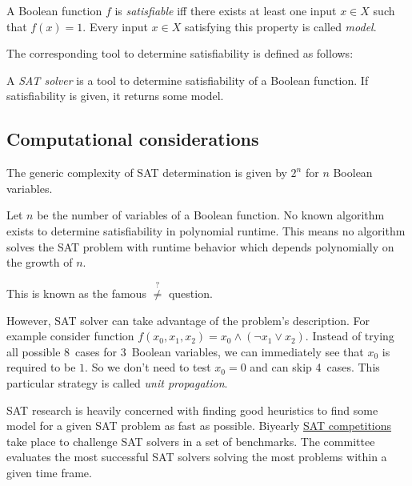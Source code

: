 \begin{defi}
  A Boolean function $f$ is \emph{satisfiable} iff there exists at least one
  input $x \in X$ such that $f(x) = 1$.
  Every input $x \in X$ satisfying this property is called \emph{model}.
\end{defi}

The corresponding tool to determine satisfiability is defined as follows:

\begin{defi}
  A \emph{SAT solver} is a tool to determine satisfiability of a Boolean function.
  If satisfiability is given, it returns some model.
\end{defi}

\subsection{Computational considerations}
\label{label:sat-complexity}
%
The generic complexity of SAT determination is given by $2^n$ for $n$ Boolean variables.

Let $n$ be the number of variables of a Boolean function.
No known algorithm exists to determine satisfiability in polynomial runtime.
This means no algorithm solves the SAT problem with runtime behavior
which depends polynomially on the growth of $n$.

This is known as the famous \cP $\overset{?}{\neq}$ \cNP question.

However, SAT solver can take advantage of the problem's description.
For example consider function $f(x_0, x_1, x_2) = x_0 \land (\neg x_1 \lor x_2)$.
Instead of trying all possible 8~cases for 3~Boolean variables,
we can immediately see that $x_0$ is required to be $1$.
So we don't need to test $x_0 = 0$ and can skip 4~cases.
This particular strategy is called \emph{unit propagation}.

SAT research is heavily concerned with finding good heuristics to find some model
for a given SAT problem as fast as possible. Biyearly
\href{http://satcompetition.org/}{SAT competitions} take place to challenge
SAT solvers in a set of benchmarks. The committee evaluates the most successful
SAT solvers solving the most problems within a given time frame.


